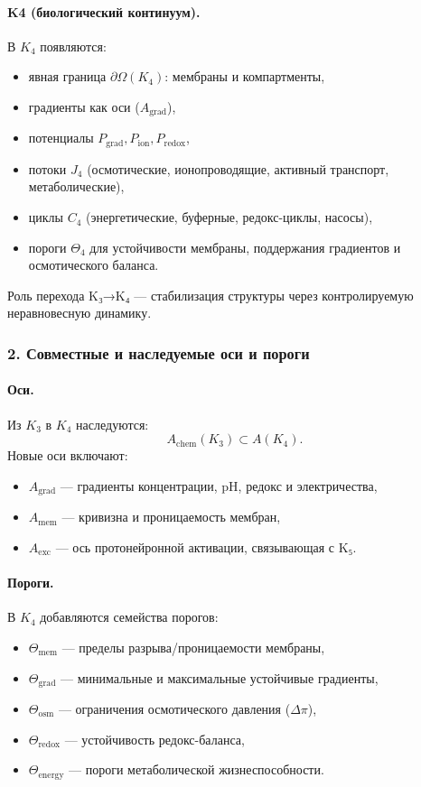 \paragraph{K4 (биологический континуум).}
В $K_4$ появляются:
\begin{itemize}
  \item явная граница $\partial\Omega(K_4)$: мембраны и компартменты,
  \item градиенты как оси ($A_{\mathrm{grad}}$),
  \item потенциалы $P_{\mathrm{grad}}, P_{\mathrm{ion}}, P_{\mathrm{redox}}$,
  \item потоки $J_4$ (осмотические, ионопроводящие, активный транспорт, метаболические),
  \item циклы $C_4$ (энергетические, буферные, редокс-циклы, насосы),
  \item пороги $\Theta_4$ для устойчивости мембраны, поддержания градиентов и
        осмотического баланса.
\end{itemize}

Роль перехода K₃→K₄ — стабилизация структуры через контролируемую
неравновесную динамику.

\subsubsection{2. Совместные и наследуемые оси и пороги}

\paragraph{Оси.}
Из $K_3$ в $K_4$ наследуются:
\[
A_{\mathrm{chem}}(K_3) \subset A(K_4).
\]
Новые оси включают:
\begin{itemize}
  \item $A_{\mathrm{grad}}$ — градиенты концентрации, pH, редокс и электричества,
  \item $A_{\mathrm{mem}}$ — кривизна и проницаемость мембран,
  \item $A_{\mathrm{exc}}$ — ось протонейронной активации, связывающая с K₅.
\end{itemize}

\paragraph{Пороги.}
В $K_4$ добавляются семейства порогов:
\begin{itemize}
  \item $\Theta_{\mathrm{mem}}$ — пределы разрыва/проницаемости мембраны,
  \item $\Theta_{\mathrm{grad}}$ — минимальные и максимальные устойчивые градиенты,
  \item $\Theta_{\mathrm{osm}}$ — ограничения осмотического давления ($\Delta\pi$),
  \item $\Theta_{\mathrm{redox}}$ — устойчивость редокс-баланса,
  \item $\Theta_{\mathrm{energy}}$ — пороги метаболической жизнеспособности.
\end{itemize}

